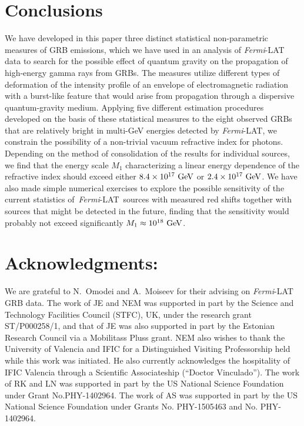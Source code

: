 \documentclass[12pt]{article}
\newcommand{\lat}{{\it Fermi}-LAT}
\begin{document}
{\section{Conclusions}
\label{sec:concl2}

We have developed in this paper three distinct statistical non-parametric measures of
GRB emissions, which we have used in an analysis of {\it Fermi}-LAT data to search for the possible effect of
quantum gravity on the propagation of high-energy gamma rays from GRBs.
The measures utilize different types of deformation of the intensity profile of
an envelope of electromagnetic radiation with a burst-like feature that would arise from propagation
through a dispersive quantum-gravity medium. Applying five different estimation procedures developed
on the basis of these statistical measures to the eight observed GRBs that are relatively bright in multi-GeV
energies detected by \lat, we constrain the possibility of a non-trivial
vacuum refractive index for photons. Depending on the method of consolidation
of the results for individual sources, we find that the energy scale $M_1$ characterizing a
linear energy dependence of the refractive index should exceed either $8.4\times 10^{17}\ {\rm GeV}$
or $2.4 \times 10^{17}\ {\rm GeV}$. We have also made simple numerical exercises to explore
the possible sensitivity of the current statistics of~\lat\ sources with measured red shifts together with sources
that might be detected in the future, finding that the sensitivity would probably not exceed significantly $M_{1}\approx 10^{18}\ {\rm GeV}$.

\section*{Acknowledgments:}

We are grateful to N.~Omodei and A.~Moiseev for their advising on {\it Fermi}-LAT GRB data.
The work of JE and NEM was supported in part by the Science and Technology Facilities Council (STFC), UK,
under the research grant ST/P000258/1, and that of JE was also supported in part by the Estonian Research Council
via a Mobilitass Pluss grant.
NEM also wishes to thank the University of Valencia and IFIC for a Distinguished Visiting Professorship held while
this work was initiated. He also currently acknowledges the hospitality of IFIC Valencia through a Scientific Associateship (``Doctor Vinculado'').
The work of RK and LN was supported in part by the US National Science Foundation under Grant No.PHY-1402964.
The work of AS was supported in part by the US National Science Foundation under Grants
No. PHY-1505463 and No. PHY-1402964.

}
\end{document}
